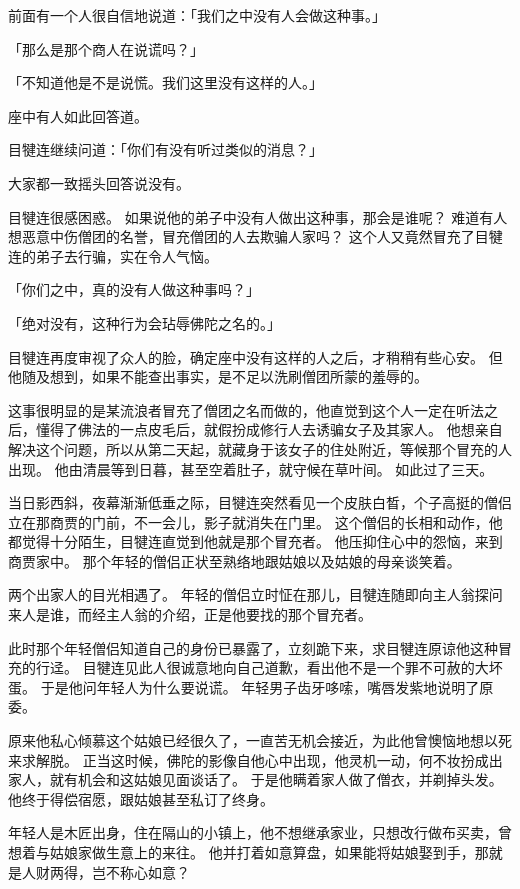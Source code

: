 \documentclass[twoside,openany]{book}
\begin{document}
前面有一个人很自信地说道：「我们之中没有人会做这种事。」

「那么是那个商人在说谎吗？」

「不知道他是不是说慌。我们这里没有这样的人。」

座中有人如此回答道。

目犍连继续问道：「你们有没有听过类似的消息？」

大家都一致摇头回答说没有。

目犍连很感困惑。
如果说他的弟子中没有人做出这种事，那会是谁呢？
难道有人想恶意中伤僧团的名誉，冒充僧团的人去欺骗人家吗？
这个人又竟然冒充了目犍连的弟子去行骗，实在令人气恼。

「你们之中，真的没有人做这种事吗？」

「绝对没有，这种行为会玷辱佛陀之名的。」

目犍连再度审视了众人的脸，确定座中没有这样的人之后，才稍稍有些心安。
但他随及想到，如果不能查出事实，是不足以洗刷僧团所蒙的羞辱的。

这事很明显的是某流浪者冒充了僧团之名而做的，他直觉到这个人一定在听法之后，懂得了佛法的一点皮毛后，就假扮成修行人去诱骗女子及其家人。
他想亲自解决这个问题，所以从第二天起，就藏身于该女子的住处附近，等候那个冒充的人出现。
他由清晨等到日暮，甚至空着肚子，就守候在草叶间。
如此过了三天。

当日影西斜，夜幕渐渐低垂之际，目犍连突然看见一个皮肤白晳，个子高挺的僧侣立在那商贾的门前，不一会儿，影子就消失在门里。
这个僧侣的长相和动作，他都觉得十分陌生，目犍连直觉到他就是那个冒充者。
他压抑住心中的怨恼，来到商贾家中。
那个年轻的僧侣正状至熟络地跟姑娘以及姑娘的母亲谈笑着。

两个出家人的目光相遇了。
年轻的僧侣立时怔在那儿，目犍连随即向主人翁探问来人是谁，而经主人翁的介绍，正是他要找的那个冒充者。

此时那个年轻僧侣知道自己的身份已暴露了，立刻跪下来，求目犍连原谅他这种冒充的行迳。
目犍连见此人很诚意地向自己道歉，看出他不是一个罪不可赦的大坏蛋。
于是他问年轻人为什么要说谎。
年轻男子齿牙哆嗦，嘴唇发紫地说明了原委。

原来他私心倾慕这个姑娘已经很久了，一直苦无机会接近，为此他曾懊恼地想以死来求解脱。
正当这时候，佛陀的影像自他心中出现，他灵机一动，何不妆扮成出家人，就有机会和这姑娘见面谈话了。
于是他瞒着家人做了僧衣，并剃掉头发。
他终于得偿宿愿，跟姑娘甚至私订了终身。

年轻人是木匠出身，住在隔山的小镇上，他不想继承家业，只想改行做布买卖，曾想着与姑娘家做生意上的来往。
他并打着如意算盘，如果能将姑娘娶到手，那就是人财两得，岂不称心如意？
\end{document}
